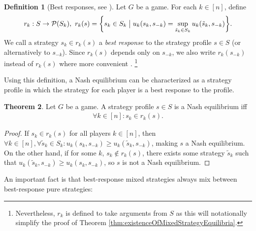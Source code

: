 \documentclass[a4paper]{scrreprt}
\theoremstyle{definition}
\newtheorem{thm}{Theorem}[chapter] %
\newtheorem{defn}[thm]{Definition} %
\begin{document}
    \begin{defn}[Best responses, see \cite{bib:fudenbergGameTheory}]
        Let $G$ be a game. For each $k \in [n]$, define
        \begin{gather*} 
            r_k: S \to \operatorname{\mathcal{P}}(S_k),~ r_k(s) = \biggl\{s_k \in S_k \bigm\vert u_k(s_k, s_{-k}) = \sup_{\tilde{s}_k \in S_k} u_k(\tilde{s}_k, s_{-k}) \biggr\}.
        \end{gather*} 
        We call a strategy $s_k \in r_k(s)$ a \emph{best response} to the strategy profile $s \in S$ (or alternatively to $s_{-k}$).
        Since $r_k(s)$ depends only on $s_{-k}$, we also write $r_k(s_{-k})$ instead of $r_k(s)$ where more convenient \cite{bib:fudenbergGameTheory}.
        \footnote{Nevertheless, $r_k$ is defined to take arguments from $S$ as this will notationally simplify the proof of Theorem \ref{thm:existenceOfMixedStrategyEquilibria}.}
    \end{defn}
%    
    Using this definition, a Nash equilibrium can be characterized as a strategy profile in which the strategy for each player is a best response to the profile.
%    
    \begin{thm}
        \label{thm:nashEquilibriumCharacterizationByBestResponses}
        Let $G$ be a game. A strategy profile $s \in S$ is a Nash equilibrium iff 
        \begin{gather*}
            \forall k \in [n]: s_k \in r_k(s).
        \end{gather*}
    \end{thm}
    \begin{proof}
        If $s_k \in r_k(s)$ for all players $k \in [n]$, then $\forall k \in [n], \forall \tilde{s}_k \in S_k: u_k(s_k, s_{-k}) \geq u_k(\tilde{s}_k, s_{-k})$, making $s$ a Nash equilibrium.
        On the other hand, if for some $k$, $s_k \notin r_k(s)$, there exists some strategy $\tilde{s}_k$
        such that $u_k(\tilde{s}_k, s_{-k}) \geq u_k(s_k, s_{-k})$,
        so $s$ is not a Nash equilibrium.
    \end{proof}

    An important fact is that best-response mixed strategies always mix between best-response pure strategies:
\end{document}
